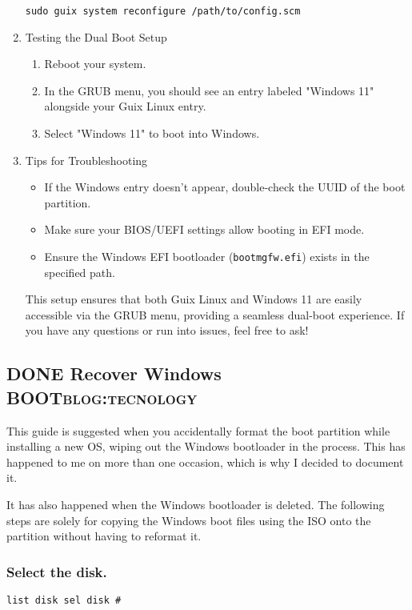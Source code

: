 \documentclass[11pt]{article}
\begin{document}
\begin{enumerate}
\begin{verbatim}
sudo guix system reconfigure /path/to/config.scm
\end{verbatim}
\item Testing the Dual Boot Setup
\label{sec:org75f76b2}
\begin{enumerate}
\item Reboot your system.
\item In the GRUB menu, you should see an entry labeled "Windows 11" alongside your Guix Linux entry.
\item Select "Windows 11" to boot into Windows.
\end{enumerate}
\item Tips for Troubleshooting
\label{sec:org27a78e3}
\begin{itemize}
\item If the Windows entry doesn’t appear, double-check the UUID of the boot partition.
\item Make sure your BIOS/UEFI settings allow booting in EFI mode.
\item Ensure the Windows EFI bootloader (\texttt{bootmgfw.efi}) exists in the specified path.
\end{itemize}

This setup ensures that both Guix Linux and Windows 11 are easily accessible via the GRUB menu, providing a seamless dual-boot experience. If you have any questions or run into issues, feel free to ask!
\end{enumerate}
\subsection{{\bfseries\sffamily DONE} Recover Windows BOOT\hfill{}\textsc{blog:tecnology}}
\label{sec:org2769f37}
This guide is suggested when you accidentally format the boot partition while installing a new OS, wiping out the Windows bootloader in the process. This has happened to me on more than one occasion, which is why I decided to document it.

It has also happened when the Windows bootloader is deleted. The following steps are solely for copying the Windows boot files using the ISO onto the partition without having to reformat it.
\subsubsection{Select the disk.}
\label{sec:org68603da}
\begin{verbatim}
list disk sel disk # 
\end{verbatim}
\end{document}
